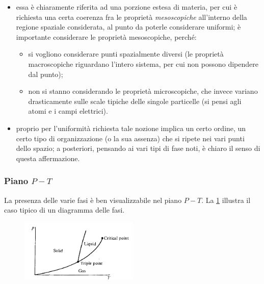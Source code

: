\begin{itemize}
	\item essa è chiaramente riferita ad una porzione estesa di materia, per cui è richiesta una certa coerenza fra le proprietà \textit{mesoscopiche} all'interno della regione spaziale considerata, al punto da poterle considerare uniformi; è importante considerare le proprietà mesoscopiche, perché:
	\begin{itemize}
		\item si vogliono considerare punti spazialmente diversi (le proprietà macroscopiche riguardano l'intero sistema, per cui non possono dipendere dal punto);
		\item non si stanno considerando le proprietà microscopiche, che invece variano drasticamente sulle scale tipiche delle singole particelle (si pensi agli atomi e i campi elettrici).
	\end{itemize}
	\item proprio per l'uniformità richiesta tale nozione implica un certo ordine, un certo tipo di organizzazione (o la sua assenza) che si ripete nei vari punti dello spazio; a posteriori, pensando ai vari tipi di fase noti, è chiaro il senso di questa affermazione. 
\end{itemize}

\subsubsection{Piano $P-T$}

La presenza delle varie fasi è ben visualizzabile nel piano $P-T$. La \cref{fig:phdiagr} illustra il caso tipico di un diagramma delle fasi.

\begin{figure}
	\vspace{-30pt}
	\centering
	\includegraphics[width=0.5\textwidth]{Immagini/PhaseDiagram.png}
	\caption{}
	\label{fig:phdiagr}
	\vspace{-30pt}
\end{figure}

